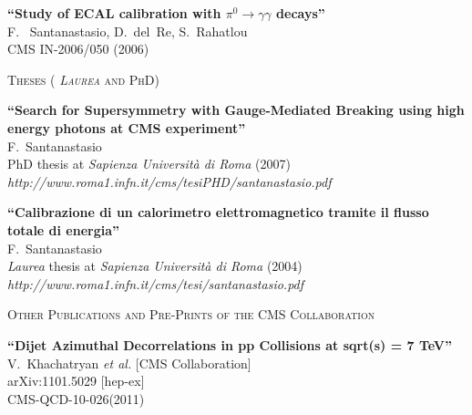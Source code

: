 \documentclass[10pt, a4paper]{article}
\begin{document}
\begin{thebibliography}{599}
{\bf ``Study of ECAL calibration with $\pi^0 \rightarrow \gamma \gamma$ decays''}
  \\{}F. ~Santanastasio, D.~del~Re, S.~Rahatlou
  \\{}CMS IN-2006/050 (2006)

\vspace{0.1cm} \begin{center} \textsc{Theses ( \textit{Laurea} and PhD)} \end{center} \vspace{0.05cm}

{\bf ``Search for Supersymmetry with Gauge-Mediated Breaking using high energy photons at CMS experiment''}
  \\{}F.~Santanastasio
  \\{}PhD thesis at \textit{Sapienza Universit\`a di Roma} (2007)
\\{}{\it http://www.roma1.infn.it/cms/tesiPHD/santanastasio.pdf}

{\bf ``Calibrazione di un calorimetro elettromagnetico tramite il flusso totale di energia''}
  \\{}F.~Santanastasio
  \\{}\textit{Laurea} thesis at \textit{Sapienza Universit\`a di Roma} (2004)
\\{}{\it http://www.roma1.infn.it/cms/tesi/santanastasio.pdf }


\vspace{0.1cm} \begin{center} \textsc{Other Publications and Pre-Prints of the CMS Collaboration} \end{center} \vspace{0.05cm}

{\bf ``Dijet Azimuthal Decorrelations in pp Collisions at sqrt(s) = 7 TeV''}
  \\{}V.~Khachatryan {\it et al.}  [CMS Collaboration]
  \\{}arXiv:1101.5029 [hep-ex]
\\{}CMS-QCD-10-026(2011)


\end{thebibliography}
\end{document}
